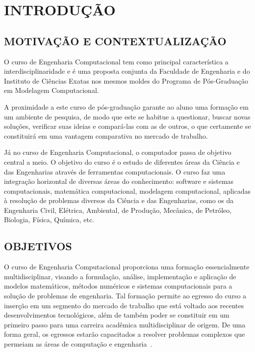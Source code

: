 \chapter{INTRODUÇÃO}


\section{\uppercase{Motivação e Contextualização}}

O curso de Engenharia Computacional tem como principal característica a interdisciplinaridade e é uma proposta conjunta da Faculdade de Engenharia e do Instituto de Ciências Exatas nos mesmos moldes do Programa de Pós-Graduação em Modelagem Computacional.

A proximidade a este curso de pós-graduação garante ao aluno uma formação em um ambiente de pesquisa, de modo que este se habitue a questionar, buscar novas soluções, verificar suas ideias e compará-las com as de outros, o que certamente se constituirá em uma vantagem comparativa no mercado de trabalho.

Já no curso de Engenharia Computacional, o computador passa de objetivo central a meio. O objetivo do curso é o estudo de diferentes áreas da Ciência e das Engenharias através de ferramentas computacionais. O curso faz uma integração horizontal de diversas áreas do conhecimento: software e sistemas computacionais, matemática computacional, modelagem computacional, aplicadas à resolução de problemas diversos da Ciência e das Engenharias, como os da Engenharia Civil, Elétrica, Ambiental, de Produção, Mecânica, de Petróleo, Biologia, Física, Química, etc.

\section{\uppercase{Objetivos}}

O curso de Engenharia Computacional proporciona uma formação essencialmente multidisciplinar, visando a formulação, análise, implementação e aplicação de modelos matemáticos, métodos numéricos e sistemas computacionais para a solução de problemas de engenharia. Tal formação permite ao egresso do curso a inserção em um segmento do mercado de trabalho que está voltado aos recentes desenvolvimentos tecnológicos, além de também poder se constituir em um primeiro passo para uma carreira acadêmica multidisciplinar de origem. De uma forma geral, os egressos estarão capacitados a resolver problemas complexos que permeiam as áreas de computação e engenharia~\citep{lobosco2018design}.

